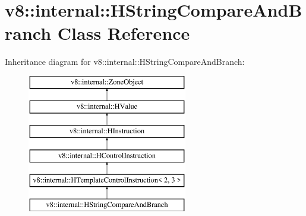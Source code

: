 \hypertarget{classv8_1_1internal_1_1_h_string_compare_and_branch}{}\section{v8\+:\+:internal\+:\+:H\+String\+Compare\+And\+Branch Class Reference}
\label{classv8_1_1internal_1_1_h_string_compare_and_branch}
Inheritance diagram for v8\+:\+:internal\+:\+:H\+String\+Compare\+And\+Branch\+:\begin{figure}[H]
\begin{center}
\leavevmode
\includegraphics[height=6.000000cm]{classv8_1_1internal_1_1_h_string_compare_and_branch}
\end{center}
\end{figure}
